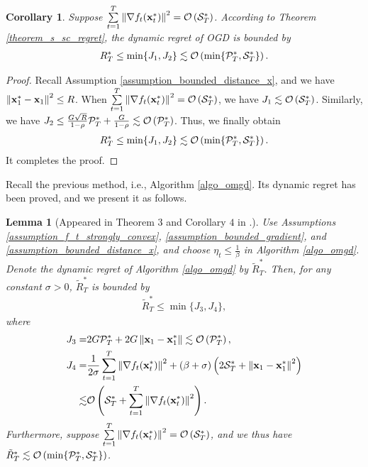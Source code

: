 \documentclass{article}
\newtheorem{Lemma}{\bf{Lemma}}
\newtheorem{Corollary}{\bf{Corollary}}
\begin{document}
\begin{Corollary}
Suppose $\sum\limits_{t=1}^{T} \left\lVert\nabla f_t({\bf x}_t^{\ast})\right\rVert^2 = {\mathcal{O}} \left( {\mathcal{S}}_T^{\ast} \right) $. According to Theorem \ref{theorem_s_sc_regret}, the dynamic regret of OGD is bounded by 
\begin{align}
\nonumber
R_T^{\ast} \le \min \{J_1, J_2\} \lesssim {\mathcal{O}}\left(  \min \{{\mathcal{P}}_T^{\ast}, {\mathcal{S}}_T^{\ast} \}  \right).
\end{align}

\end{Corollary} 
\begin{proof}
Recall Assumption \ref{assumption_bounded_distance_x}, and we have $\left\lVert{\bf x}_1^{\ast} - {\bf x}_1\right\rVert^2  \le R$. When $\sum\limits_{t=1}^{T} \left\lVert\nabla f_t({\bf x}_t^{\ast})\right\rVert^2 = {\mathcal{O}} \left( {\mathcal{S}}_T^{\ast} \right) $, we have $J_1 \lesssim {\mathcal{O}}\left( {\mathcal{S}}_T^{\ast} \right)$. Similarly, we have $J_2\le \frac{G\sqrt{R}}{1-\rho} {\mathcal{P}}_T^{\ast} + \frac{G}{1-\rho} \lesssim {\mathcal{O}}\left( {\mathcal{P}}_T^{\ast} \right)$. Thus, we finally obtain
\begin{align}
\nonumber
R_T^{\ast} \le \min \{J_1, J_2\} \lesssim {\mathcal{O}}\left(  \min\{{\mathcal{P}}_T^{\ast}, {\mathcal{S}}_T^{\ast} \}  \right).
\end{align} It completes the proof.

\end{proof}





Recall the previous method, i.e., Algorithm \ref{algo_omgd}. Its dynamic regret has been proved, and we present it as follows.
\begin{Lemma}[Appeared in Theorem $3$ and Corollary $4$ in \cite{Zhang:2016wl}.]
\label{lemma_previous_result_sc_regret}
Use Assumptions \ref{assumption_f_t_strongly_convex}, \ref{assumption_bounded_gradient}, and \ref{assumption_bounded_distance_x}, and choose $\eta_t \le \frac{1}{\beta}$ in Algorithm \ref{algo_omgd}. Denote the dynamic regret of Algorithm \ref{algo_omgd} by $\tilde{R}_T^{\ast}$. Then, for any constant $\sigma>0$, $\tilde{R}_T^{\ast}$ is bounded by 
\begin{align}
\nonumber
\tilde{R}_T^{\ast} \le \min\{J_3, J_4\},
\end{align} where 
\begin{align}
\nonumber
J_3 = & 2G {\mathcal{P}}_T^{\ast} + 2G \left\lVert{\bf x}_1 - {\bf x}_1^\ast\right\rVert \lesssim {\mathcal{O}}\left( {\mathcal{P}}_T^{\ast} \right), \\ \nonumber
J_4 = & \frac{1}{2\sigma} \sum_{t=1}^T \left\lVert\nabla f_t({\bf x}_t^\ast)\right\rVert^2 +(\beta + \sigma) \left(  2{\mathcal{S}}_T^{\ast}  +  \left\lVert{\bf x}_1 - {\bf x}_1^\ast\right\rVert^2  \right) \\ \nonumber
\lesssim & {\mathcal{O}}\left( {\mathcal{S}}_T^{\ast} + \sum_{t=1}^T \left\lVert\nabla f_t({\bf x}_t^\ast)\right\rVert^2 \right).
\end{align} Furthermore, suppose $\sum\limits_{t=1}^{T} \left\lVert\nabla f_t({\bf x}_t^{\ast})\right\rVert^2 = {\mathcal{O}} \left( {\mathcal{S}}_T^{\ast} \right) $, and we thus have $\tilde{R}_T^{\ast} \lesssim {\mathcal{O}}\left(  \min \{ {\mathcal{P}}_T^{\ast}, {\mathcal{S}}_T^{\ast} \}  \right)$.
\end{Lemma}
\end{document}
